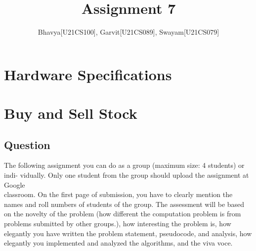 \documentclass{article}
\title{Assignment 7}
\author{Bhavya[U21CS100], Garvit[U21CS089], Swayam[U21CS079]}
\begin{document}
    \maketitle

    \section{Hardware Specifications}

    \noindent{}
    \section{Buy and Sell Stock}
    \subsection{Question}
    The following assignment you can do as a group (maximum size: 4 students) or indi-
vidually. Only one student from the group should upload the assignment at Google
\\
classroom. On the first page of submission, you have to clearly mention the names and
roll numbers of students of the group. The assessment will be based on the novelty
of the problem (how different the computation problem is from problems submitted
by other groups.), how interesting the problem is, how elegantly you have written the
problem statement, pseudocode, and analysis, how elegantly you implemented and
analyzed the algorithms, and the viva voce.
\end{document}

